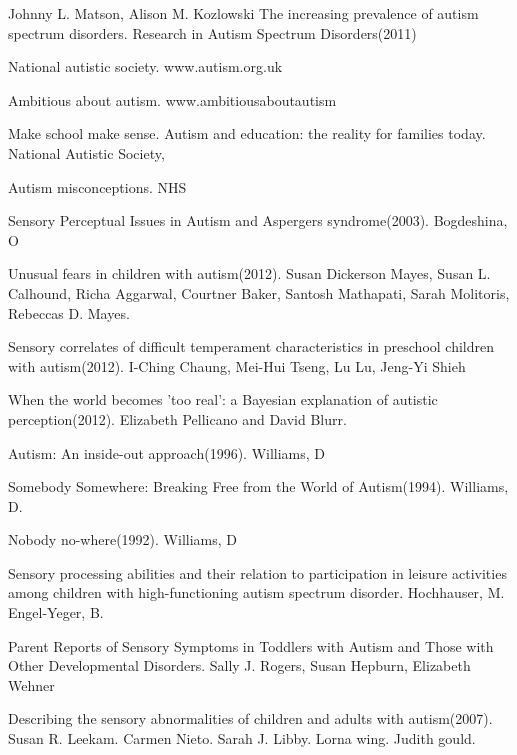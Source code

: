 \documentclass[11pt]{report}
\begin{document}
\begin{thebibliography}{9}



Johnny L. Matson, Alison M. Kozlowski
The increasing prevalence of autism spectrum disorders. Research in Autism Spectrum Disorders(2011)

National autistic society. www.autism.org.uk

Ambitious about autism. www.ambitiousaboutautism

Make school make sense. Autism and education: the reality for families today. National Autistic Society, 

Autism misconceptions. NHS

Sensory Perceptual Issues in Autism and Aspergers syndrome(2003). Bogdeshina, O

Unusual fears in children with autism(2012). Susan Dickerson Mayes, Susan L. Calhound, Richa Aggarwal, Courtner Baker, Santosh Mathapati, Sarah Molitoris, Rebeccas D. Mayes.

Sensory correlates of difficult temperament characteristics in preschool children with autism(2012). I-Ching Chaung, Mei-Hui Tseng, Lu Lu, Jeng-Yi Shieh

When the world becomes 'too real': a Bayesian explanation of autistic perception(2012). Elizabeth Pellicano and David Blurr.

Autism: An inside-out approach(1996). Williams, D

Somebody Somewhere: Breaking Free from the World of Autism(1994). Williams, D.

Nobody no-where(1992). Williams, D

Sensory processing abilities and their relation to participation in leisure activities among children with high-functioning autism spectrum disorder. Hochhauser, M. Engel-Yeger, B.

Parent Reports of Sensory Symptoms in Toddlers with Autism and Those with Other Developmental Disorders. Sally J. Rogers, Susan Hepburn, Elizabeth Wehner

Describing the sensory abnormalities of children and adults with autism(2007). Susan R. Leekam. Carmen Nieto. Sarah J. Libby. Lorna wing. Judith gould. 


\end{thebibliography}
\end{document}
